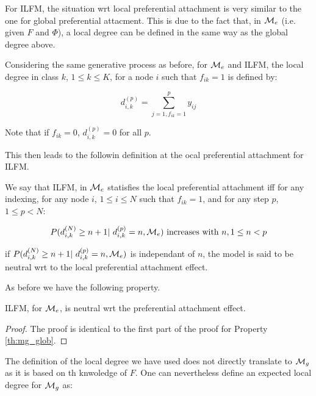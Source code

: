 For ILFM, the situation wrt local preferential attachment is very similar to the one for global preferential attacment.
This is due to the fact that, in $\mathcal{M}_e$ (i.e. given $F$ and $\Phi$), a local degree can be defined in the same way as the global degree above.

Considering the same generative process as before, for $\mathcal{M}_e$ and ILFM, the local degree in class $k$, $1\leq k\leq K$, for a node $i$ such that $f_{ik}=1$ is defined by:

\begin{equation*}
d_{i,k}^{(p)} = \sum_{j=1, f_{ik}=1}^p y_{ij}
\end{equation*}

Note that if $f_{ik}=0$, $d_{i,k}^{(p)} = 0$ for all $p$.

This then leads to the followin definition at the ocal preferential attachment for ILFM.

\begin{definition}

We say that ILFM, in $\mathcal{M}_e$ statisfies the local preferential attachment iff for any indexing, for any node $i$, $1\leq i \leq N$ such that $f_{ik}=1$, and for any step $p$, $1\leq p < N$:

\begin{equation*}
P(d_{i,k}^{(N)} \geq n+1 | d_{i,k}^{(p)}=n,\M_e) \textrm{ increases with } n , 1\leq n < p
\end{equation*}

if $P(d_{i,k}^{(N)} \geq n+1 | d_{i,k}^{(p)}=n,\M_e)$ is independant of $n$, the model is said to be neutral wrt to the local preferential attachment effect.

\end{definition}
As before we have the following property.

\begin{proposition}
ILFM, for $\mathcal{M}_e$, is neutral wrt the preferential attachment effect.
\end{proposition}

\begin{proof}
The proof is identical to the first part of the proof for Property \ref{th:mg_glob}.
\end{proof}

The definition of the local degree we have used does not directly translate to $\mathcal{M}_g$ as it is based on th knwoledge of $F$. One can nevertheless define an expected local degree for $\mathcal{M}_g$ as:

